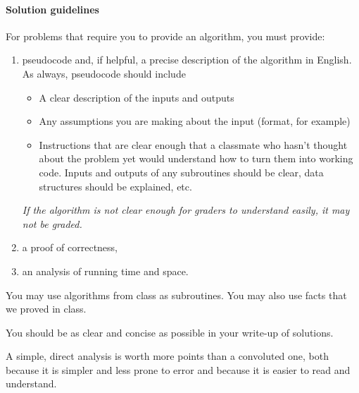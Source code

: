 \documentclass[11pt]{article}
\begin{document}
\paragraph{Solution guidelines} For problems that require you to provide an algorithm, you must provide:
\begin{enumerate}
	\item pseudocode and, if helpful, a precise description of the algorithm in English. As always, pseudocode should include
  \begin{itemize}
		\item A clear description of the inputs and outputs
    \item Any assumptions you are making about the input (format, for example)
    \item Instructions that are clear enough that a classmate who
      hasn't thought about the problem yet would understand how to
      turn them into working code. Inputs and
      outputs of any subroutines should be clear, data structures
      should be explained, etc. 
  \end{itemize}
  \emph{If the algorithm is not clear enough for graders to understand easily, it may not be graded. }
	\item a proof of correctness,
		\item an analysis of running time and space.
\end{enumerate}
You may use algorithms from class as subroutines. You may also use facts that we proved in class.

You should be as clear and concise as possible in your write-up of
solutions. 

A simple, direct analysis is worth more points than a
convoluted one, both because it is simpler and less prone to error and
because it is easier to read and understand.

\newpage
\end{document}
